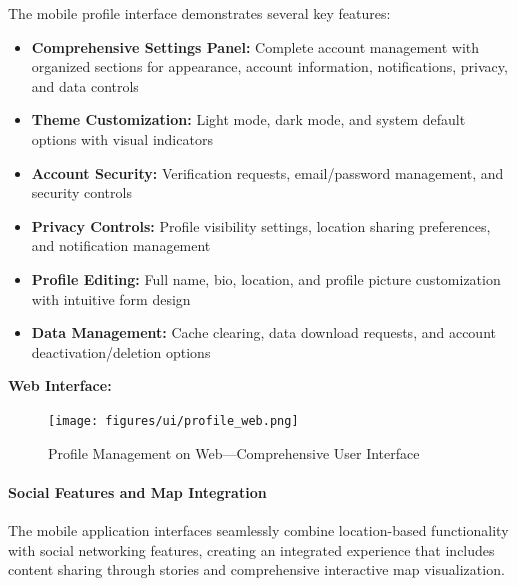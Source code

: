 The mobile profile interface demonstrates several key features:
\begin{itemize}
    \item \textbf{Comprehensive Settings Panel:} Complete account management with organized sections for appearance, account information, notifications, privacy, and data controls
    \item \textbf{Theme Customization:} Light mode, dark mode, and system default options with visual indicators
    \item \textbf{Account Security:} Verification requests, email/password management, and security controls
    \item \textbf{Privacy Controls:} Profile visibility settings, location sharing preferences, and notification management
    \item \textbf{Profile Editing:} Full name, bio, location, and profile picture customization with intuitive form design
    \item \textbf{Data Management:} Cache clearing, data download requests, and account deactivation/deletion options
\end{itemize}

\textbf{Web Interface:}
\begin{figure}[!htbp]
    \centering
    \texttt{[image: figures/ui/profile\_web.png]}
    \caption{Profile Management on Web---Comprehensive User Interface}\label{fig:web_profile}
\end{figure}

\paragraph{Social Features and Map Integration}
The mobile application interfaces seamlessly combine location-based functionality with social networking features, creating an integrated experience that includes content sharing through stories and comprehensive interactive map visualization.

